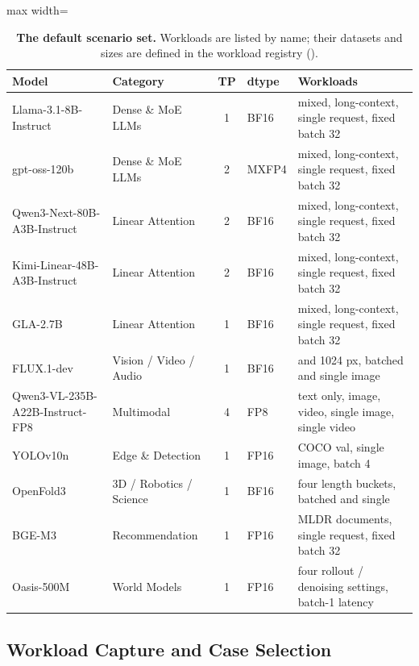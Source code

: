 \begin{table}[t]
  \centering
  \caption{\textbf{The default scenario set.} Workloads are listed by name; their datasets and sizes are defined in the workload registry ().}
  \label{fastkernels:tab:default_scenarios}
  \scriptsize
  \setlength{\tabcolsep}{3pt}
  \begin{adjustbox}{max width=\linewidth}
  \begin{tabular}{@{}llcl>{\raggedright\arraybackslash}p{5.6cm}@{}}
  \toprule
  \textbf{Model} & \textbf{Category} & \textbf{TP} & \textbf{dtype} & \textbf{Workloads} \\
  \midrule
  Llama-3.1-8B-Instruct & Dense \& MoE LLMs & 1 & BF16 & mixed, long-context, single request, fixed batch 32 \\
  gpt-oss-120b & Dense \& MoE LLMs & 2 & MXFP4 & mixed, long-context, single request, fixed batch 32 \\
  Qwen3-Next-80B-A3B-Instruct & Linear Attention & 2 & BF16 & mixed, long-context, single request, fixed batch 32 \\
  Kimi-Linear-48B-A3B-Instruct & Linear Attention & 2 & BF16 & mixed, long-context, single request, fixed batch 32 \\
  GLA-2.7B & Linear Attention & 1 & BF16 & mixed, long-context, single request, fixed batch 32 \\
  FLUX.1-dev & Vision / Video / Audio & 1 & BF16 & 512 and 1024 px, batched and single image \\
  Qwen3-VL-235B-A22B-Instruct-FP8 & Multimodal & 4 & FP8 & text only, image, video, single image, single video \\
  YOLOv10n & Edge \& Detection & 1 & FP16 & COCO val, single image, batch 4 \\
  OpenFold3 & 3D / Robotics / Science & 1 & BF16 & four length buckets, batched and single \\
  BGE-M3 & Recommendation & 1 & FP16 & MLDR documents, single request, fixed batch 32 \\
  Oasis-500M & World Models & 1 & FP16 & four rollout / denoising settings, batch-1 latency \\
  \bottomrule
  \end{tabular}
  \end{adjustbox}
\end{table}

\subsection{Workload Capture and Case Selection}
\label{fastkernels:sec:capture}

